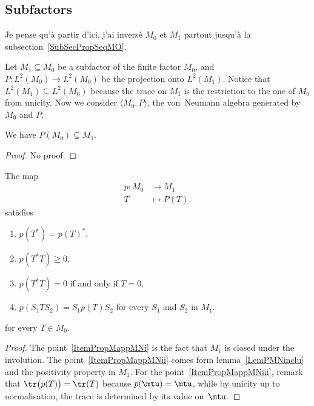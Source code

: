 					\subsection{Subfactors}

\begin{probleme}
Je pense qu'à partir d'ici, j'ai inversé $M_0$ et $M_1$ partout jusqu'à la subsection~\ref{SubSecPropSeqMO}.
\end{probleme}

Let $M_1\subseteq M_0$ be a subfactor of the finite factor $M_0$, and $P\colon L^2(M_0)\to L^2(M_0)$ be the projection onto $L^2(M_1)$. Notice that $L^2(M_1)\subseteq L^2(M_0)$ because the trace on $M_1$ is the restriction to the one of $M_0$ from unicity. Now we consider $\langle M_0, P\rangle $, the von~Neumann algebra generated by $M_0$ and $P$.

\begin{lemma}		\label{LemPMNinclu}
We have $P(M_0)\subseteq M_1$.
\end{lemma}
\begin{proof}
No proof.
\end{proof}

\begin{proposition}		\label{PropPropMappMN}
The map
\begin{equation}
\begin{aligned}
p \colon M_0&\to M_1 \\
   T&\mapsto P(T).
\end{aligned}
\end{equation}
satisfies
\begin{enumerate}
\item\label{ItemPropMappMNi} $p(T^*)=p(T)^*$,
\item\label{ItemPropMappMNii}$p(T^*T)\geq 0$,
\item\label{ItemPropMappMNiii} $p(T^*T)=0$ if and only if $T=0$,
\item\label{ItemPropMappMNiv} $p(S_1TS_2)=S_1p(T)S_2$ for every $S_1$ and $S_2$ in $M_1$.
\end{enumerate}
for every $T\in M_0$.
\end{proposition}

\begin{proof}
The point~\ref{ItemPropMappMNi} is the fact that $M_1$ is closed under the involution. The point~\ref{ItemPropMappMNii} comes form lemma~\ref{LemPMNinclu} and the positivity property in $M_1$. For the point~\ref{ItemPropMappMNiii}, remark that $\tr\big( p(T) \big)=\tr(T)$ because $p(\mtu)=\mtu$, while by unicity up to normalisation, the trace is determined by its value on~$\mtu$.
\end{proof}

